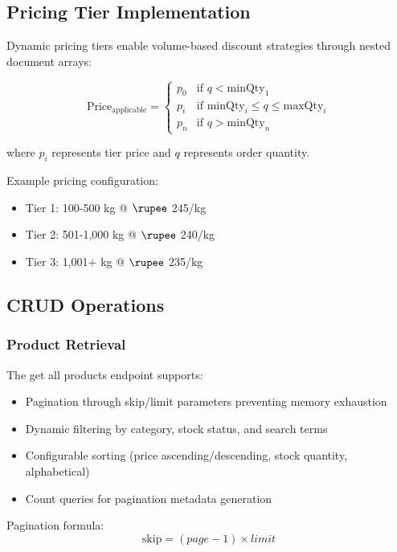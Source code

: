 \documentclass[conference]{IEEEtran}
\begin{document}
\subsection{Pricing Tier Implementation}

Dynamic pricing tiers enable volume-based discount strategies through nested document arrays:

\begin{equation}
\text{Price}_{\text{applicable}} = \begin{cases}
p_0 & \text{if } q < \text{minQty}_1 \\
p_i & \text{if minQty}_i \leq q \leq \text{maxQty}_i \\
p_n & \text{if } q > \text{minQty}_n
\end{cases}
\end{equation}

where $p_i$ represents tier price and $q$ represents order quantity.

Example pricing configuration:
\begin{itemize}
\item Tier 1: 100-500 kg @ $\rupee$ 245/kg
\item Tier 2: 501-1,000 kg @ $\rupee$ 240/kg
\item Tier 3: 1,001+ kg @ $\rupee$ 235/kg
\end{itemize}

\subsection{CRUD Operations}

\subsubsection{Product Retrieval}
The get all products endpoint supports:
\begin{itemize}
\item Pagination through skip/limit parameters preventing memory exhaustion
\item Dynamic filtering by category, stock status, and search terms
\item Configurable sorting (price ascending/descending, stock quantity, alphabetical)
\item Count queries for pagination metadata generation
\end{itemize}

Pagination formula:
\begin{equation}
\text{skip} = (page - 1) \times limit
\end{equation}
\end{document}
